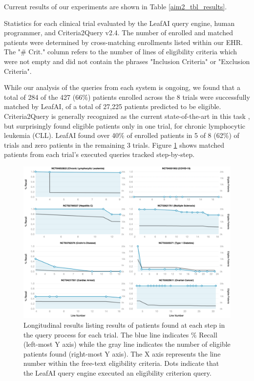 \documentclass[../main.tex]{subfiles}
\begin{document}
Current results of our experiments are shown in Table \ref{aim2_tbl_results}.

\begin{table}[h!]
    \footnotesize
    \centering
    
    \caption{Statistics for each clinical trial evaluated by the LeafAI query engine, human programmer, and Criteria2Query v2.4. The number of enrolled and matched patients were determined by cross-matching enrollments listed within our EHR. The "\# Crit." column refers to the number of lines of eligibility criteria which were not empty and did not contain the phrases "Inclusion Criteria" or "Exclusion Criteria".}
    \label{aim2_tbl_results}
\end{table} 

While our analysis of the queries from each system is ongoing, we found that a total of 284 of the 427 (66\%) patients enrolled across the 8 trials were successfully matched by LeafAI, of a total of 27,225 patients predicted to be eligible. Criteria2Query is generally recognized as the current state-of-the-art in this task \cite{tseo2020information, zhang2020deepenroll, gao2020compose}, but surprisingly found eligible patients only in one trial, for chronic lymphocytic leukemia (CLL). LeafAI found over 40\% of enrolled patients in 5 of 8 (62\%) of trials and zero patients in the remaining 3 trials. Figure \ref{aim2_fig_leafai_results_detail} shows matched patients from each trial's executed queries tracked step-by-step.

\begin{figure}[h!]
  \includegraphics[scale=0.47]{Figures/Aim2/aim2_leafai_detail_results_longitudinal.png}  
  \caption{Longitudinal results listing results of patients found at each step in the query process for each trial. The blue line indicates \% Recall (left-most Y axis) while the gray line indicates the number of eligible patients found (right-most Y axis). The X axis represents the line number within the free-text eligibility criteria. Dots indicate that the LeafAI query engine executed an eligibility criterion query.}
\label{aim2_fig_leafai_results_detail}
\end{figure}
\end{document}
